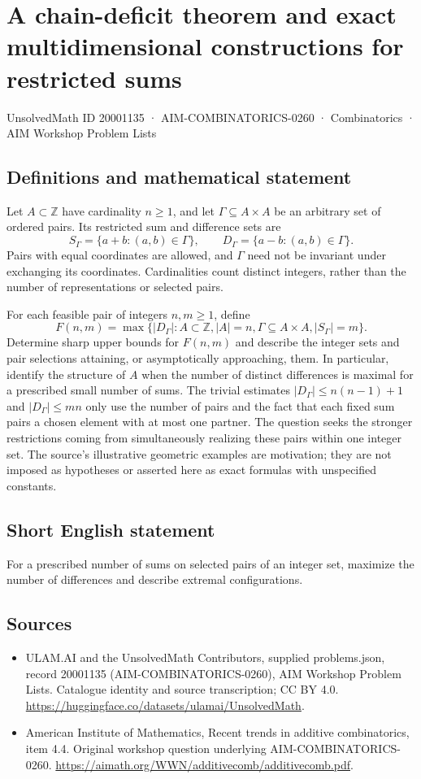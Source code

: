 \documentclass[11pt,a4paper]{article}
\begin{document}
\section*{A chain-deficit theorem and exact multidimensional constructions for restricted sums}\label{20001135}
{\small UnsolvedMath ID 20001135 · AIM-COMBINATORICS-0260 · Combinatorics · AIM Workshop Problem Lists}
\subsection{Definitions and mathematical statement}
Let $A\subset\mathbb Z$ have cardinality $n\geq1$, and let $\Gamma\subseteq A\times A$ be an arbitrary set of ordered pairs.
Its restricted sum and difference sets are
\[
 S_\Gamma=\{a+b:(a,b)\in\Gamma\},\qquad
 D_\Gamma=\{a-b:(a,b)\in\Gamma\}.
\]
Pairs with equal coordinates are allowed, and $\Gamma$ need not be invariant under exchanging its coordinates.
Cardinalities count distinct integers, rather than the number of representations or selected pairs.

For each feasible pair of integers $n,m\geq1$, define
\[
 F(n,m)=\max\{|D_\Gamma|:
       A\subset\mathbb Z, |A|=n,
       \Gamma\subseteq A\times A, |S_\Gamma|=m\}.
\]
Determine sharp upper bounds for $F(n,m)$ and describe the integer sets and pair selections attaining, or asymptotically approaching, them.
In particular, identify the structure of $A$ when the number of distinct differences is maximal for a prescribed small number of sums.
The trivial estimates $|D_\Gamma|\leq n(n-1)+1$ and $|D_\Gamma|\leq mn$ only use the number of pairs and the fact that each fixed sum pairs a chosen element with at most one partner.
The question seeks the stronger restrictions coming from simultaneously realizing these pairs within one integer set.
The source's illustrative geometric examples are motivation; they are not imposed as hypotheses or asserted here as exact formulas with unspecified constants.
\subsection{Short English statement}
For a prescribed number of sums on selected pairs of an integer set, maximize the number of differences and describe extremal configurations.
\subsection{Sources}
\begin{itemize}
\item[S1] ULAM.AI and the UnsolvedMath Contributors, supplied problems.json, record 20001135 (AIM-COMBINATORICS-0260), AIM Workshop Problem Lists. Catalogue identity and source transcription; CC BY 4.0.
\url{https://huggingface.co/datasets/ulamai/UnsolvedMath}.
\item[S2] American Institute of Mathematics, Recent trends in additive combinatorics, item 4.4. Original workshop question underlying AIM-COMBINATORICS-0260.
\url{https://aimath.org/WWN/additivecomb/additivecomb.pdf}.
\end{itemize}
\end{document}
